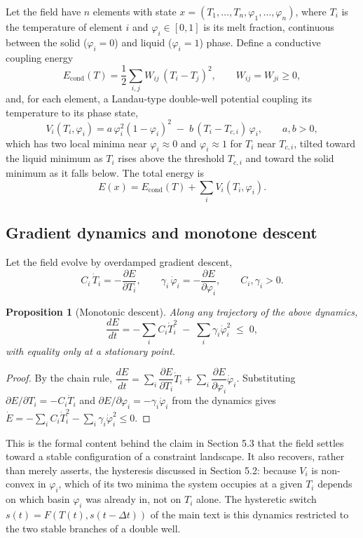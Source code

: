 \documentclass[11pt]{article}
\newtheorem{proposition}{Proposition}
\begin{document}
Let the field have $n$ elements with state $x = (T_1,\ldots,T_n,\varphi_1,\ldots,\varphi_n)$, where $T_i$ is the temperature of element $i$ and $\varphi_i \in [0,1]$ is its melt fraction, continuous between the solid ($\varphi_i = 0$) and liquid ($\varphi_i = 1$) phase. Define a conductive coupling energy
\[
E_{\mathrm{cond}}(T) = \frac{1}{2}\sum_{i,j} W_{ij}\,(T_i - T_j)^2, \qquad W_{ij} = W_{ji} \ge 0,
\]
and, for each element, a Landau-type double-well potential coupling its temperature to its phase state,
\[
V_i(T_i,\varphi_i) = a\,\varphi_i^2(1-\varphi_i)^2 \;-\; b\,(T_i - T_{c,i})\,\varphi_i, \qquad a,b>0,
\]
which has two local minima near $\varphi_i \approx 0$ and $\varphi_i \approx 1$ for $T_i$ near $T_{c,i}$, tilted toward the liquid minimum as $T_i$ rises above the threshold $T_{c,i}$ and toward the solid minimum as it falls below. The total energy is
\[
E(x) = E_{\mathrm{cond}}(T) + \sum_i V_i(T_i,\varphi_i).
\]

\subsection{Gradient dynamics and monotone descent}

Let the field evolve by overdamped gradient descent,
\[
C_i\,\dot T_i = -\frac{\partial E}{\partial T_i}, \qquad \gamma_i\,\dot\varphi_i = -\frac{\partial E}{\partial \varphi_i}, \qquad C_i,\gamma_i > 0.
\]

\begin{proposition}[Monotonic descent]
Along any trajectory of the above dynamics,
\[
\frac{dE}{dt} = -\sum_i C_i \dot T_i^2 \;-\; \sum_i \gamma_i \dot\varphi_i^2 \;\le\; 0,
\]
with equality only at a stationary point.
\end{proposition}

\begin{proof}
By the chain rule, $\dfrac{dE}{dt} = \sum_i \dfrac{\partial E}{\partial T_i}\dot T_i + \sum_i \dfrac{\partial E}{\partial \varphi_i}\dot\varphi_i$. Substituting $\partial E/\partial T_i = -C_i\dot T_i$ and $\partial E/\partial \varphi_i = -\gamma_i \dot\varphi_i$ from the dynamics gives $\dot E = -\sum_i C_i\dot T_i^2 - \sum_i \gamma_i \dot\varphi_i^2 \le 0$.
\end{proof}

This is the formal content behind the claim in Section 5.3 that the field settles toward a stable configuration of a constraint landscape. It also recovers, rather than merely asserts, the hysteresis discussed in Section 5.2: because $V_i$ is non-convex in $\varphi_i$, which of its two minima the system occupies at a given $T_i$ depends on which basin $\varphi_i$ was already in, not on $T_i$ alone. The hysteretic switch $s(t) = F(T(t),s(t-\Delta t))$ of the main text is this dynamics restricted to the two stable branches of a double well.
\end{document}
